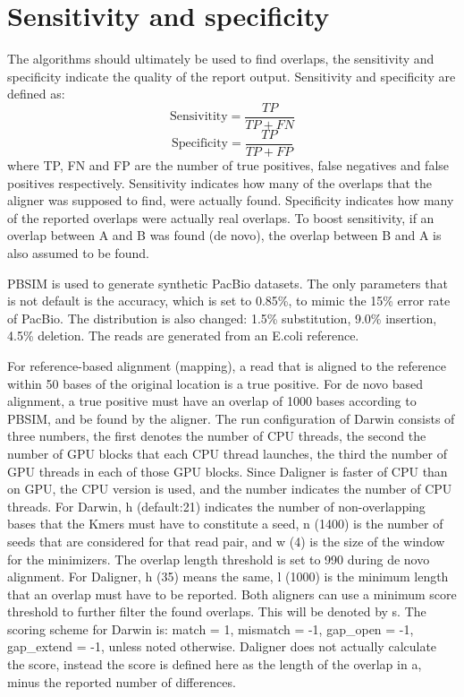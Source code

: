 \documentclass[../thesis.tex]{subfiles}
\begin{document}
\section{Sensitivity and specificity}
The algorithms should ultimately be used to find overlaps, the sensitivity and specificity indicate the quality of the report output.
Sensitivity and specificity are defined as:
$$\text{Sensivitity} = \frac{TP}{TP + FN}$$
$$\text{Specificity} = \frac{TP}{TP + FP}$$
where TP, FN and FP are the number of true positives, false negatives and false positives respectively.
Sensitivity indicates how many of the overlaps that the aligner was supposed to find, were actually found.
Specificity indicates how many of the reported overlaps were actually real overlaps.
To boost sensitivity, if an overlap between A and B was found (de novo), the overlap between B and A is also assumed to be found.

PBSIM \cite{PBSIM} is used to generate synthetic PacBio datasets.
The only parameters that is not default is the accuracy, which is set to 0.85\%, to mimic the 15\% error rate of PacBio.
The distribution is also changed: 1.5\% substitution, 9.0\% insertion, 4.5\% deletion.
The reads are generated from an E.coli reference.

For reference-based alignment (mapping), a read that is aligned to the reference within 50 bases of the original location is a true positive.
For de novo based alignment, a true positive must have an overlap of 1000 bases according to PBSIM, and be found by the aligner.
The run configuration of Darwin consists of three numbers, the first denotes the number of CPU threads, the second the number of GPU blocks that each CPU thread launches, the third the number of GPU threads in each of those GPU blocks.
Since Daligner is faster of CPU than on GPU, the CPU version is used, and the number indicates the number of CPU threads.
For Darwin, h (default:21) indicates the number of non-overlapping bases that the Kmers must have to constitute a seed, n (1400) is the number of seeds that are considered for that read pair, and w (4) is the size of the window for the minimizers.
The overlap length threshold is set to 990 during de novo alignment.
For Daligner, h (35) means the same, l (1000) is the minimum length that an overlap must have to be reported.
Both aligners can use a minimum score threshold to further filter the found overlaps.
This will be denoted by s.
The scoring scheme for Darwin is: match = 1, mismatch = -1, gap\_open = -1, gap\_extend = -1, unless noted otherwise.
Daligner does not actually calculate the score, instead the score is defined here as the length of the overlap in a, minus the reported number of differences.
\end{document}
